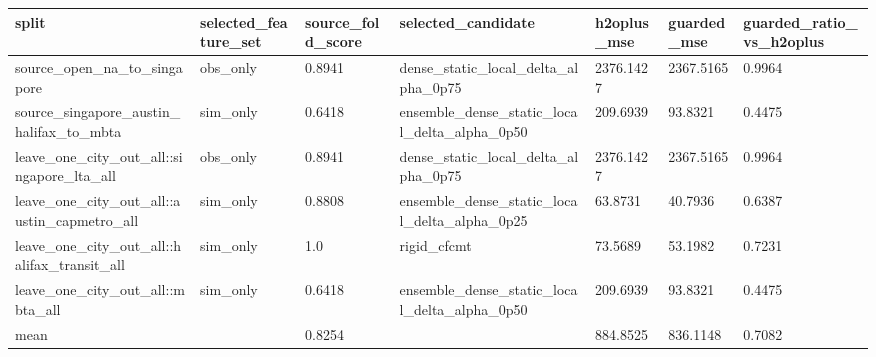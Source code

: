 \begin{tabular}{lllllll}
\toprule
split & selected\_feature\_set & source\_fold\_score & selected\_candidate & h2oplus\_mse & guarded\_mse & guarded\_ratio\_vs\_h2oplus \\
\midrule
source\_open\_na\_to\_singapore & obs\_only & 0.8941 & dense\_static\_local\_delta\_alpha\_0p75 & 2376.1427 & 2367.5165 & 0.9964 \\
source\_singapore\_austin\_halifax\_to\_mbta & sim\_only & 0.6418 & ensemble\_dense\_static\_local\_delta\_alpha\_0p50 & 209.6939 & 93.8321 & 0.4475 \\
leave\_one\_city\_out\_all::singapore\_lta\_all & obs\_only & 0.8941 & dense\_static\_local\_delta\_alpha\_0p75 & 2376.1427 & 2367.5165 & 0.9964 \\
leave\_one\_city\_out\_all::austin\_capmetro\_all & sim\_only & 0.8808 & ensemble\_dense\_static\_local\_delta\_alpha\_0p25 & 63.8731 & 40.7936 & 0.6387 \\
leave\_one\_city\_out\_all::halifax\_transit\_all & sim\_only & 1.0 & rigid\_cfcmt & 73.5689 & 53.1982 & 0.7231 \\
leave\_one\_city\_out\_all::mbta\_all & sim\_only & 0.6418 & ensemble\_dense\_static\_local\_delta\_alpha\_0p50 & 209.6939 & 93.8321 & 0.4475 \\
mean &  & 0.8254 &  & 884.8525 & 836.1148 & 0.7082 \\
\bottomrule
\end{tabular}
